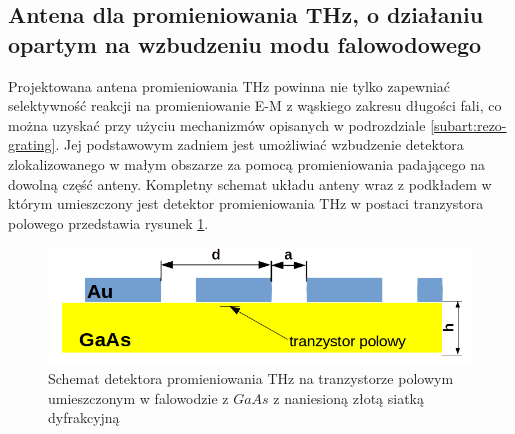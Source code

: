 \subsection{Antena dla promieniowania THz, o działaniu opartym na wzbudzeniu modu falowodowego}
Projektowana antena promieniowania THz powinna nie tylko zapewniać selektywność reakcji na promieniowanie E-M z wąskiego zakresu długości fali, co można uzyskać przy użyciu mechanizmów opisanych w podrozdziale \ref{subart:rezo-grating}. Jej podstawowym zadniem jest umożliwiać wzbudzenie detektora zlokalizowanego w małym obszarze za pomocą promieniowania padającego na dowolną część anteny. Kompletny schemat układu anteny wraz z podkładem w którym umieszczony jest detektor promieniowania THz w postaci tranzystora polowego przedstawia rysunek \ref{fig:schem-podklad-falo}.
\begin{figure}
	\centering
	\includegraphics[width=\textwidth]{images/thz/schemat-podklad-falo.png}
	\caption{Schemat detektora promieniowania THz na tranzystorze polowym umieszczonym w falowodzie z $GaAs$ z naniesioną złotą siatką dyfrakcyjną}
	\label{fig:schem-podklad-falo}
\end{figure}

